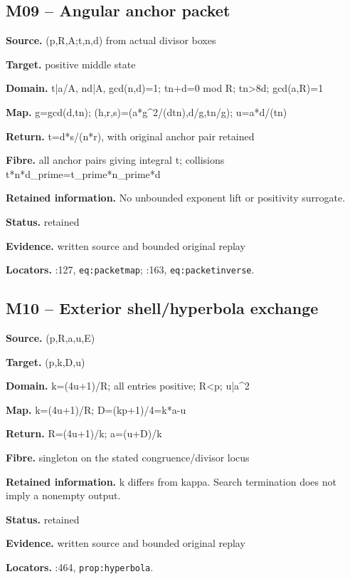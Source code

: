 \subsection*{M09 -- Angular anchor packet}
\noindent\textbf{Source.} (p,R,A;t,n,d) from actual divisor boxes\par
\noindent\textbf{Target.} positive middle state\par
\noindent\textbf{Domain.} t|a/A, nd|A, gcd(n,d)=1; tn+d=0 mod R; tn>8d; gcd(a,R)=1\par
\noindent\textbf{Map.} g=gcd(d,tn); (h,r,s)=(a*g\textasciicircum{}2/(dtn),d/g,tn/g); u=a*d/(tn)\par
\noindent\textbf{Return.} t=d*s/(n*r), with original anchor pair retained\par
\noindent\textbf{Fibre.} all anchor pairs giving integral t; collisions t*n*d\_prime=t\_prime*n\_prime*d\par
\noindent\textbf{Retained information.} No unbounded exponent lift or positivity surrogate.\par
\noindent\textbf{Status.} retained\par
\noindent\textbf{Evidence.} written source and bounded original replay\par
\noindent\textbf{Locators.} :127, \texttt{eq:packetmap}; :163, \texttt{eq:packetinverse}.
\subsection*{M10 -- Exterior shell/hyperbola exchange}
\noindent\textbf{Source.} (p,R,a,u,E)\par
\noindent\textbf{Target.} (p,k,D,u)\par
\noindent\textbf{Domain.} k=(4u+1)/R; all entries positive; R<p; u|a\textasciicircum{}2\par
\noindent\textbf{Map.} k=(4u+1)/R; D=(kp+1)/4=k*a-u\par
\noindent\textbf{Return.} R=(4u+1)/k; a=(u+D)/k\par
\noindent\textbf{Fibre.} singleton on the stated congruence/divisor locus\par
\noindent\textbf{Retained information.} k differs from kappa. Search termination does not imply a nonempty output.\par
\noindent\textbf{Status.} retained\par
\noindent\textbf{Evidence.} written source and bounded original replay\par
\noindent\textbf{Locators.} :464, \texttt{prop:hyperbola}.
